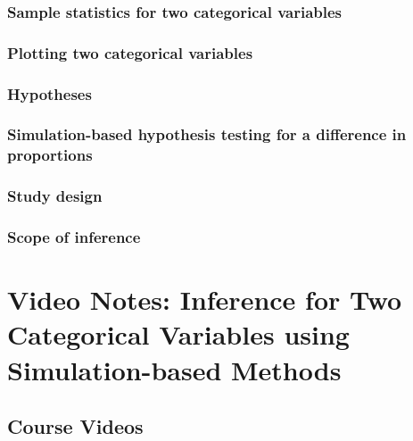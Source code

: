 \documentclass[
]{report}
\begin{document}
\subsubsection*{Sample statistics for two categorical variables}\label{sample-statistics-for-two-categorical-variables}

\subsubsection*{Plotting two categorical variables}\label{plotting-two-categorical-variables}

\subsubsection*{Hypotheses}\label{hypotheses}

\subsubsection*{Simulation-based hypothesis testing for a difference in proportions}\label{simulation-based-hypothesis-testing-for-a-difference-in-proportions}

\subsubsection*{Study design}\label{study-design}

\subsubsection{Scope of inference}\label{scope-of-inference}

\section{Video Notes: Inference for Two Categorical Variables using Simulation-based Methods}\label{video-notes-inference-for-two-categorical-variables-using-simulation-based-methods}

\subsection{Course Videos}\label{course-videos-6}
\end{document}
